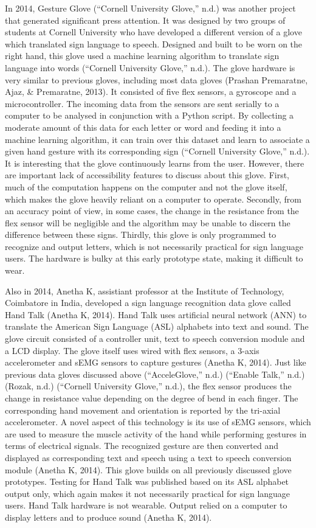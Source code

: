 In 2014, Gesture Glove (``Cornell University Glove,'' n.d.) was another project that generated significant press attention. It was designed by two groups of students at Cornell University who have developed a different version of a glove which translated sign language to speech. Designed and built to be worn on the right hand, this glove used a machine learning algorithm to translate sign language into words (``Cornell University Glove,'' n.d.). The glove hardware is very similar to previous gloves, including most data gloves (Prashan Premaratne, Ajaz, & Premaratne, 2013). It consisted of five flex sensors, a gyroscope and a microcontroller. The incoming data from the sensors are sent serially to a computer to be analysed in conjunction with a Python script. By collecting a moderate amount of this data for each letter or word and feeding it into a machine learning algorithm, it can train over this dataset and learn to associate a given hand gesture with its corresponding sign (``Cornell University Glove,'' n.d.). It is interesting that the glove continuously learns from the user. However, there are important lack of accessibility features to discuss about this glove. First, much of the computation happens on the computer and not the glove itself, which makes the glove heavily reliant on a computer to operate. Secondly, from an accuracy point of view, in some cases, the change in the resistance from the flex sensor will be negligible and the algorithm may be unable to discern the difference between these signs. Thirdly, this glove is only programmed to recognize and output letters, which is not necessarily practical for sign language users. The hardware is bulky at this early prototype state, making it difficult to wear. 


Also in 2014, Anetha K, assistiant professor at the Institute of Technology, Coimbatore in India, developed a sign language recognition data glove called Hand Talk (Anetha K, 2014). Hand Talk uses artificial neural network (ANN) to translate the American Sign Language (ASL) alphabets into text and sound. The glove circuit consisted of a controller unit, text to speech conversion module and a LCD display. The glove itself uses wired with flex sensors, a 3-axis accelerometer and sEMG sensors to capture gestures (Anetha K, 2014). Just like previous data gloves discussed above (``AcceleGlove,'' n.d.) (``Enable Talk,'' n.d.) (Rozak, n.d.) (``Cornell University Glove,'' n.d.), the flex sensor produces the change in resistance value depending on the degree of bend in each finger. The corresponding hand movement and orientation is reported by the tri-axial accelerometer. A novel aspect of this technology is its use of sEMG sensors, which are used to measure the muscle activity of the hand while performing gestures in terms of electrical signals. The recognized gesture are then converted and displayed as corresponding text and speech using a text to speech conversion module (Anetha K, 2014).  This glove builds on all previously discussed glove prototypes. Testing for Hand Talk was published based on its ASL alphabet output only, which again makes it not necessarily practical for sign language users. Hand Talk hardware is not wearable. Output relied on a computer to display letters and to produce sound (Anetha K, 2014). 


